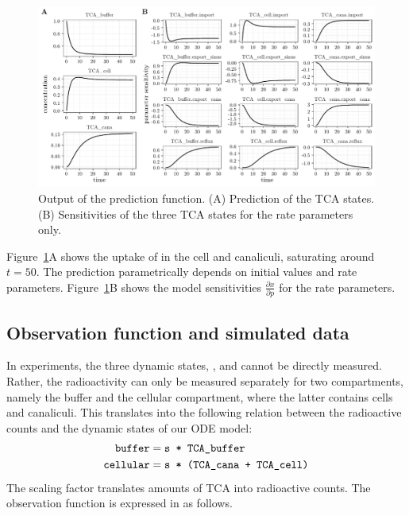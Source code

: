 \documentclass[article]{jss}
\begin{document}
\begin{figure}[ht]
	\includegraphics[width = \textwidth]{images/figure1}
	\caption{Output of the prediction function. (A) Prediction of the TCA states. (B) Sensitivities of the three TCA states for the rate parameters only.}
	\label{fig:prediction}
\end{figure}

Figure~\ref{fig:prediction}A shows the uptake of  in the cell and canaliculi, saturating around $t = 50$. The prediction parametrically depends on initial values and rate parameters. Figure~\ref{fig:prediction}B shows the model sensitivities $\frac{\partial x}{\partial p}$ for the rate parameters.

\subsection{Observation function and simulated data}
In experiments, the three dynamic states, ,  and  cannot be directly measured. Rather, the radioactivity can only be measured separately for two compartments, namely the buffer and the cellular compartment, where the latter contains cells and canaliculi.
This translates into the following relation between the radioactive counts and the dynamic states of our ODE model:
\begin{equation}
	\begin{aligned}
		\verb!buffer! &= \verb!s * TCA_buffer!\\
		\verb!cellular! &= \verb!s * (TCA_cana + TCA_cell)!
	\end{aligned}
	\label{}
\end{equation}
The scaling factor  translates amounts of TCA into radioactive counts. %
The observation function is expressed in  as follows.
\end{document}
